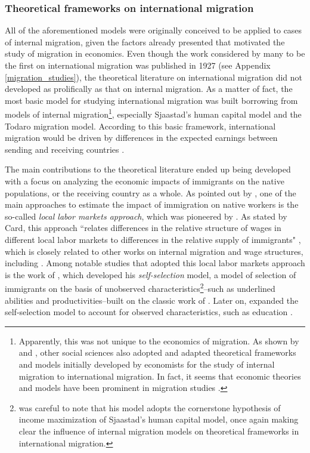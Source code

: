 \subsubsection{Theoretical frameworks on international migration} \label{lit_review_theories_international}

All of the aforementioned models were originally conceived to be applied to cases of internal migration, given the factors already presented that motivated the study of migration in economics. Even though the work considered by many to be the first on international migration was published in 1927 (see Appendix \ref{migration_studies}), the theoretical literature on international migration did not developed as prolifically as that on internal migration. As a matter of fact, the most basic model for studying international migration was built borrowing from models of internal migration\footnote{Apparently, this was not unique to the economics of migration. As shown by \cite{massey_theories_1993} and \cite{king_theories_2012}, other social sciences also adopted and adapted theoretical frameworks and models initially developed by economists for the study of internal migration to international migration. In fact, it seems that economic theories and models have been prominent in migration studies \citep{massey_theories_1993, king_theories_2012}.}, especially Sjaastad's human capital model and the Todaro migration model. According to this basic framework, international migration would be driven by differences in the expected earnings between sending and receiving countries \citep{lalonde_economic_1997}.

The main contributions to the theoretical literature ended up being developed with a focus on analyzing the economic impacts of immigrants on the native populations, or the receiving country as a whole. As pointed out by \cite{card_is_2005}, one of the main approaches to estimate the impact of immigration on native workers is the so-called \textit{local labor markets approach}, which was pioneered by \cite{grossman_substitutability_1982}. As stated by Card, this approach ``relates differences in the relative structure of wages in different local labor markets to differences in the relative supply of immigrants" \citep[p. F302]{card_is_2005}, which is closely related to other works on internal migration and wage structures, including \cite{sjaastad_costs_1962}. Among notable studies that adopted this local labor markets approach is the work of \cite{borjas_self-selection_1987}, which developed his \textit{self-selection} model, a model of selection of immigrants on the basis of unobserved characteristics\footnote{\cite{borjas_self-selection_1987} was careful to note that his model adopts the cornerstone hypothesis of income maximization of Sjaastad's human capital model, once again making clear the influence of internal migration models on theoretical frameworks in international migration.}--such as underlined abilities and productivities--built on the classic work of \citep{roy_thoughts_1951}. Later on, \cite{borjas_immigration_1991} expanded the self-selection model to account for observed characteristics, such as education \citep{borjas_economics_1994}.


